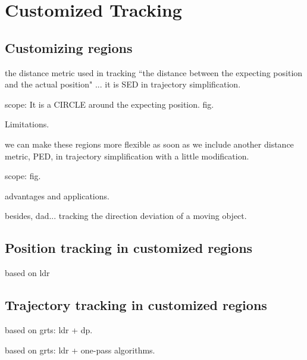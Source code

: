 

\section{Customized Tracking}
\label{sec:position}


\subsection{Customizing regions}

the distance metric used in tracking ``the distance between the expecting position and the actual position" ... it is SED in trajectory simplification. 

scope: It is  a CIRCLE around the expecting position. fig.

Limitations.

we can make these regions more flexible as soon as we include another distance metric, PED, in trajectory simplification with a little modification.

scope: fig.

advantages and applications.

besides, dad... tracking the direction deviation of a moving object.
 
\subsection{Position tracking in customized regions}
based on ldr


\subsection{Trajectory tracking in customized regions}

based on grts: ldr + dp. 

based on grts: ldr + one-pass algorithms. 